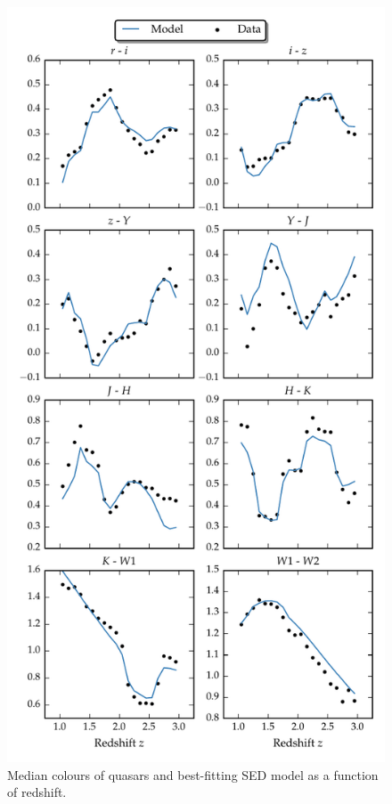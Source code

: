 \begin{figure}
\includegraphics[width=\textwidth]{figures/chapter05/sed_color_plot.pdf}
\caption[{Median colours of quasars and best-fitting SED model as a function of redshift.}]{Median colours of quasars and best-fitting SED model as a function of redshift.}
  \label{fig:color}
\end{figure}

